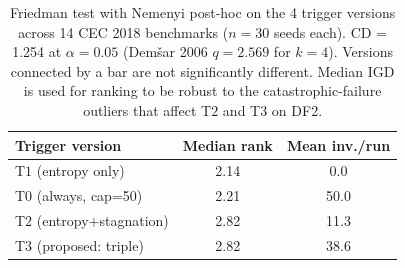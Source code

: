 \begin{table}[t]
\centering
\small
\caption{Friedman test with Nemenyi post-hoc on the 4 trigger versions across 14 CEC 2018 benchmarks ($n=30$ seeds each). CD = 1.254 at $\alpha=0.05$ (Dem\v{s}ar 2006 $q=2.569$ for $k=4$). Versions connected by a bar are not significantly different. Median IGD is used for ranking to be robust to the catastrophic-failure outliers that affect T$2$ and T$3$ on DF2.}
\label{tab:friedman-ablation}
\begin{tabular}{lcc}
\toprule
\textbf{Trigger version} & \textbf{Median rank} & \textbf{Mean inv./run} \\
\midrule
T$1$ (entropy only)    & 2.14 & 0.0 \\
T$0$ (always, cap=50)  & 2.21 & 50.0 \\
T$2$ (entropy+stagnation) & 2.82 & 11.3 \\
T$3$ (proposed: triple) & 2.82 & 38.6 \\
\bottomrule
\end{tabular}
\end{table}
